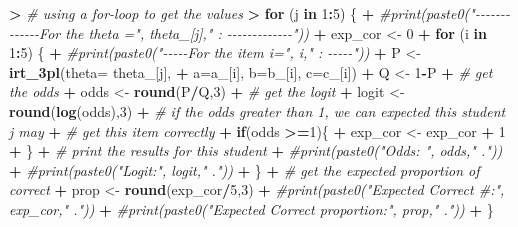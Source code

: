 \documentclass[
]{article}
\newenvironment{Shaded}{\begin{snugshade}}{\end{snugshade}}
\newcommand{\AttributeTok}[1]{\textcolor[rgb]{0.13,0.29,0.53}{#1}}
\newcommand{\CommentTok}[1]{\textcolor[rgb]{0.56,0.35,0.01}{\textit{#1}}}
\newcommand{\ControlFlowTok}[1]{\textcolor[rgb]{0.13,0.29,0.53}{\textbf{#1}}}
\newcommand{\DecValTok}[1]{\textcolor[rgb]{0.00,0.00,0.81}{#1}}
\newcommand{\ErrorTok}[1]{\textcolor[rgb]{0.64,0.00,0.00}{\textbf{#1}}}
\newcommand{\FunctionTok}[1]{\textcolor[rgb]{0.13,0.29,0.53}{\textbf{#1}}}
\newcommand{\NormalTok}[1]{#1}
\newcommand{\OtherTok}[1]{\textcolor[rgb]{0.56,0.35,0.01}{#1}}
\newcommand{\SpecialCharTok}[1]{\textcolor[rgb]{0.81,0.36,0.00}{\textbf{#1}}}
\begin{document}
\begin{Shaded}
\begin{Highlighting}[]
\SpecialCharTok{\textgreater{}} \CommentTok{\# using a for{-}loop to get the values}
\ErrorTok{\textgreater{}} \ControlFlowTok{for}\NormalTok{ (j }\ControlFlowTok{in} \DecValTok{1}\SpecialCharTok{:}\DecValTok{5}\NormalTok{) \{}
\SpecialCharTok{+}   \CommentTok{\#print(paste0("{-}{-}{-}{-}{-}{-}{-}{-}{-}{-}{-}{-}{-}For the theta =", theta\_[j]," : {-}{-}{-}{-}{-}{-}{-}{-}{-}{-}{-}{-}{-}"))}
\SpecialCharTok{+}\NormalTok{   exp\_cor }\OtherTok{\textless{}{-}} \DecValTok{0}
\SpecialCharTok{+}   \ControlFlowTok{for}\NormalTok{ (i }\ControlFlowTok{in} \DecValTok{1}\SpecialCharTok{:}\DecValTok{5}\NormalTok{) \{}
\SpecialCharTok{+}     \CommentTok{\#print(paste0("{-}{-}{-}{-}{-}For the item i=", i," : {-}{-}{-}{-}{-}"))}
\SpecialCharTok{+}\NormalTok{     P }\OtherTok{\textless{}{-}} \FunctionTok{irt\_3pl}\NormalTok{(}\AttributeTok{theta=}\NormalTok{ theta\_[j], }
\SpecialCharTok{+}                  \AttributeTok{a=}\NormalTok{a\_[i], }\AttributeTok{b=}\NormalTok{b\_[i], }\AttributeTok{c=}\NormalTok{c\_[i])}
\SpecialCharTok{+}\NormalTok{     Q }\OtherTok{\textless{}{-}} \DecValTok{1}\SpecialCharTok{{-}}\NormalTok{P}
\SpecialCharTok{+}     \CommentTok{\# get the odds}
\SpecialCharTok{+}\NormalTok{     odds }\OtherTok{\textless{}{-}} \FunctionTok{round}\NormalTok{(P}\SpecialCharTok{/}\NormalTok{Q,}\DecValTok{3}\NormalTok{)}
\SpecialCharTok{+}     \CommentTok{\# get the logit}
\SpecialCharTok{+}\NormalTok{     logit }\OtherTok{\textless{}{-}} \FunctionTok{round}\NormalTok{(}\FunctionTok{log}\NormalTok{(odds),}\DecValTok{3}\NormalTok{)    }
\SpecialCharTok{+}     \CommentTok{\# if the odds greater than 1, we can expected this student j may}
\SpecialCharTok{+}     \CommentTok{\# get this item correctly}
\SpecialCharTok{+}     \ControlFlowTok{if}\NormalTok{(odds }\SpecialCharTok{\textgreater{}=}\DecValTok{1}\NormalTok{)\{}
\SpecialCharTok{+}\NormalTok{       exp\_cor }\OtherTok{\textless{}{-}}\NormalTok{ exp\_cor }\SpecialCharTok{+} \DecValTok{1}
\SpecialCharTok{+}\NormalTok{     \}}
\SpecialCharTok{+}     \CommentTok{\# print the results for this student}
\SpecialCharTok{+}     \CommentTok{\#print(paste0("Odds: ", odds," ."))}
\SpecialCharTok{+}     \CommentTok{\#print(paste0("Logit:", logit," ."))}
\SpecialCharTok{+}\NormalTok{   \}}
\SpecialCharTok{+}   \CommentTok{\# get the expected proportion of correct}
\SpecialCharTok{+}\NormalTok{   prop }\OtherTok{\textless{}{-}} \FunctionTok{round}\NormalTok{(exp\_cor}\SpecialCharTok{/}\DecValTok{5}\NormalTok{,}\DecValTok{3}\NormalTok{)}
\SpecialCharTok{+}   \CommentTok{\#print(paste0("Expected Correct \#:", exp\_cor," ."))}
\SpecialCharTok{+}   \CommentTok{\#print(paste0("Expected Correct proportion:", prop," ."))}
\SpecialCharTok{+}\NormalTok{ \}}
\end{Highlighting}
\end{Shaded}
\end{document}

